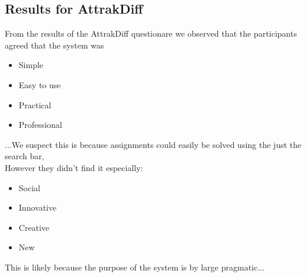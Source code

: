 \subsection{Results for AttrakDiff}
From the results of the AttrakDiff questionare we observed that the participants agreed that the system was
\begin{itemize}
\item Simple
\item Easy to use
\item Practical
\item Professional
\end{itemize}
...We suspect this is because assignments could easily be solved using the just the search bar,  \\
However they didn't find it especially:
\begin{itemize}
\item Social
\item Innovative
\item Creative
\item New
\end{itemize}
This is likely because the purpose of the system is by large pragmatic...